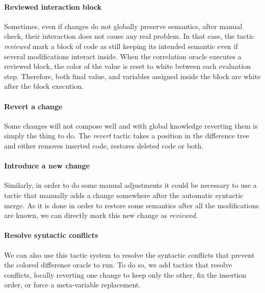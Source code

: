\documentclass[a4paper,11pt]{article}
\newcommand\rtstate[3]{\langle #1, #2, #3\rangle}
\begin{document}
\paragraph{Reviewed interaction block}
%
Sometimes, even if changes do not globally preserve semantics, after
manual check, their interaction does not cause any real problem. In
that case, the tactic \textit{reviewed} mark a block of code as still
keeping its intended semantic even if several modifications interact
inside. When the correlation oracle executes a reviewed block, the
color of the value is reset to white between each evaluation
step. Therefore, both final value, and variables assigned inside the
block are white after the block execution.

\paragraph{Revert a change}
%
Some changes will not compose well and with global knowledge reverting
them is simply the thing to do. The \textit{revert} tactic takes a
position in the difference tree and either removes inserted code,
restores deleted code or both.

\paragraph{Introduce a new change}
%
Similarly, in order to do some manual adjustments it could be
necessary to use a tactic that manually adds a change somewhere after
the automatic syntactic merge. As it is done in order to restore some
semantics after all the modifications are known, we can directly mark
this new change as \textit{reviewed}.

\paragraph{Resolve syntactic conflicts}
%
We can also use this tactic system to resolve the syntactic conflicts
that prevent the colored difference oracle to run. To do so, we add
tactics that resolve conflicts, locally reverting one change to keep
only the other, fix the insertion order, or force a meta-variable
replacement.
\end{document}
